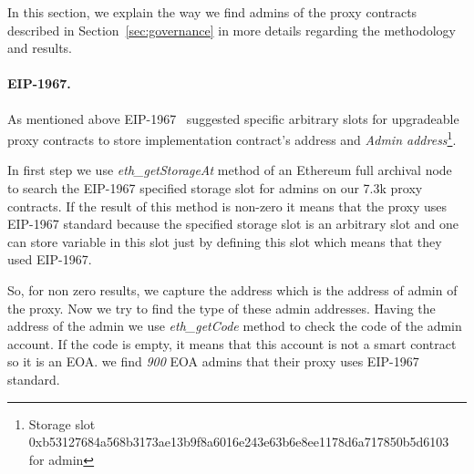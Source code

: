 In this section, we explain the way we find admins of the proxy contracts described in Section~\ref{sec:governance} in more details regarding the methodology and results.

\paragraph{EIP-1967.}As mentioned above EIP-1967~\cite{eip1967} suggested specific arbitrary slots for upgradeable proxy contracts to store implementation contract's address and \textit{Admin address}\footnote{Storage slot 0xb53127684a568b3173ae13b9f8a6016e243e63b6e8ee1178d6a717850b5d6103 for admin}.

In first step we use \textit{eth\_getStorageAt} method of an Ethereum full archival node to search the EIP-1967 specified storage slot for admins on our 7.3k proxy contracts. If the result of this method is non-zero it means that the proxy uses EIP-1967 standard because the specified storage slot is an arbitrary slot and one can store variable in this slot just by defining this slot which means that they used EIP-1967.

So, for non zero results, we capture the address which is the address of admin of the proxy. Now we try to find the type of these admin addresses. Having the address of the admin we use \textit{eth\_getCode} method to check the code of the admin account. If the code is empty, it means that this account is not a smart contract so it is an EOA. we find \textit{900} EOA admins that their proxy uses EIP-1967 standard.

